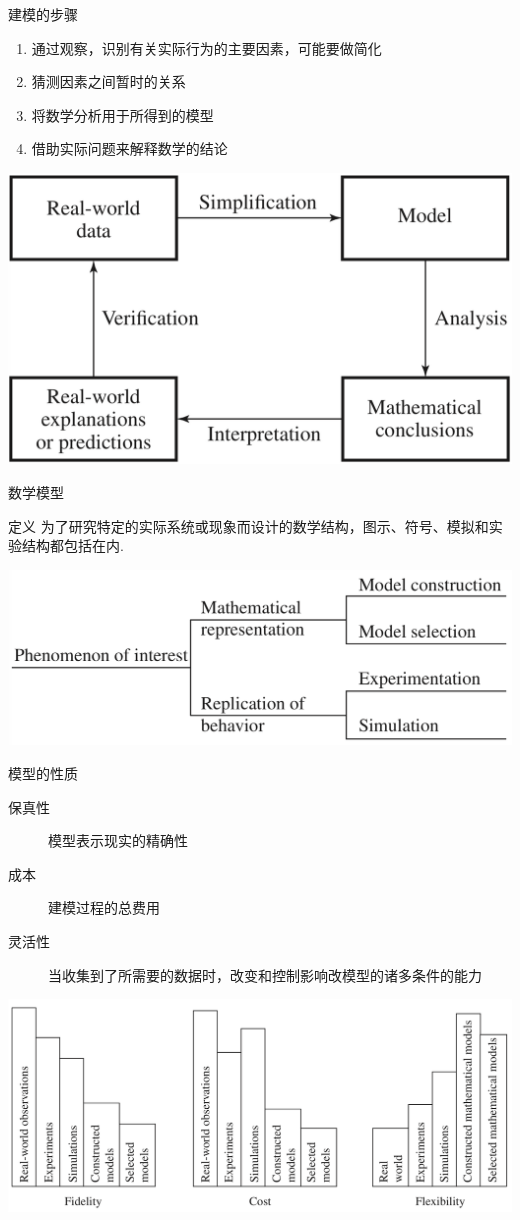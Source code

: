 \documentclass[UTF8, mathserif]{ctexbeamer}
\begin{document}
\begin{frame}{建模的步骤}

  \begin{enumerate}
  \item 通过观察，识别有关实际行为的主要因素，可能要做简化
  \item 猜测因素之间暂时的关系
  \item 将数学分析用于所得到的模型
  \item 借助实际问题来解释数学的结论
  \end{enumerate}

  \begin{center}
    \includegraphics[width=.5\textwidth{}]{mmstep.png}
  \end{center}
\end{frame}

\begin{frame}{数学模型}

  \begin{block}{定义}
    为了研究特定的实际系统或现象而设计的数学结构，图示、符号、模拟和实验结构都包括在内.
  \end{block}

  \begin{center}
    \includegraphics[width=.6\textwidth{}]{modelprop.png}
  \end{center}
  
\end{frame}

\begin{frame}{模型的性质}
  \begin{description}
  \item[保真性] 模型表示现实的精确性
  \item[成本] 建模过程的总费用
  \item[灵活性] 当收集到了所需要的数据时，改变和控制影响改模型的诸多条件的能力
  \end{description}
  
  \begin{center}
    \includegraphics[width=.6\textwidth{}]{modelcompare.png}
  \end{center}
\end{frame}
\end{document}
